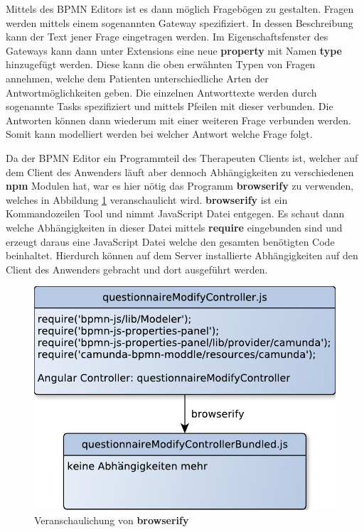 Mittels des BPMN Editors ist es dann möglich Fragebögen zu gestalten. Fragen werden mittels einem sogenannten Gateway spezifiziert. In dessen Beschreibung kann der Text jener Frage eingetragen werden. Im Eigenschaftsfenster des Gateways kann dann unter Extensions eine neue \textbf{property} mit Namen \textbf{type} hinzugefügt werden. Diese kann die oben erwähnten Typen von Fragen annehmen, welche dem Patienten unterschiedliche Arten der Antwortmöglichkeiten geben. Die einzelnen Antworttexte werden durch sogenannte Tasks spezifiziert und mittels Pfeilen mit dieser verbunden. Die Antworten können dann wiederum mit einer weiteren Frage verbunden werden. Somit kann modelliert werden bei welcher Antwort welche Frage folgt.

Da der BPMN Editor ein Programmteil des Therapeuten Clients ist, welcher auf dem Client des Anwenders läuft aber dennoch Abhängigkeiten zu verschiedenen \textbf{npm} Modulen hat, war es hier nötig das Programm \textbf{browserify} zu verwenden, welches in Abbildung \ref{browserifyErlauterung} veranschaulicht wird. \textbf{browserify} ist ein Kommandozeilen Tool und nimmt JavaScript Datei entgegen. Es schaut dann welche Abhängigkeiten in dieser Datei mittels \textbf{require} eingebunden sind und erzeugt daraus eine JavaScript Datei welche den gesamten benötigten Code beinhaltet. Hierdurch können auf dem Server installierte Abhängigkeiten auf den Client des Anwenders gebracht und dort ausgeführt werden. 

\begin{figure}[H]
	\centering
	\includegraphics[scale=0.7]{images/browserifyErlauterung}
	\caption[Veranschaulichung von \textbf{browserify}]{Veranschaulichung von \textbf{browserify}}
	\label{browserifyErlauterung}
\end{figure}


